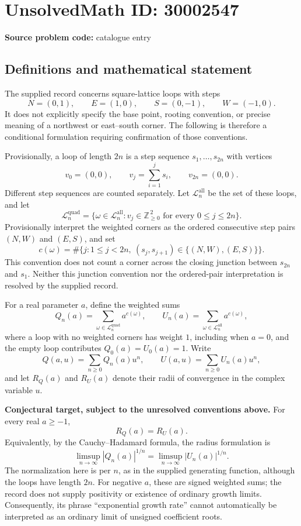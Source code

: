 \documentclass[11pt]{article}
\newcommand{\Z}{\mathbb{Z}}
\begin{document}
\section*{UnsolvedMath ID: 30002547}
\textbf{Source problem code:} catalogue entry
\subsection{Definitions and mathematical statement}
The supplied record concerns square-lattice loops with steps
\[
N=(0,1),\qquad E=(1,0),\qquad S=(0,-1),\qquad W=(-1,0).
\]
It does not explicitly specify the base point, rooting convention, or precise meaning of a northwest or east--south corner. The following is therefore a conditional formulation requiring confirmation of those conventions.

Provisionally, a loop of length \(2n\) is a step sequence \(s_1,\ldots,s_{2n}\) with vertices
\[
v_0=(0,0),\qquad v_j=\sum_{i=1}^{j}s_i,\qquad v_{2n}=(0,0).
\]
Different step sequences are counted separately. Let \(\mathcal L_n^{\mathrm{all}}\) be the set of these loops, and let
\[
\mathcal L_n^{\mathrm{quad}}
=\{\omega\in\mathcal L_n^{\mathrm{all}}:v_j\in\Z_{\geq0}^{\,2}\text{ for every }0\leq j\leq2n\}.
\]
Provisionally interpret the weighted corners as the ordered consecutive step pairs \((N,W)\) and \((E,S)\), and set
\[
c(\omega)=\#\{j:1\leq j<2n,\ (s_j,s_{j+1})\in\{(N,W),(E,S)\}\}.
\]
This convention does not count a corner across the closing junction between \(s_{2n}\) and \(s_1\). Neither this junction convention nor the ordered-pair interpretation is resolved by the supplied record.

For a real parameter \(a\), define the weighted sums
\[
Q_n(a)=\sum_{\omega\in\mathcal L_n^{\mathrm{quad}}}a^{c(\omega)},\qquad
U_n(a)=\sum_{\omega\in\mathcal L_n^{\mathrm{all}}}a^{c(\omega)},
\]
where a loop with no weighted corners has weight \(1\), including when \(a=0\), and the empty loop contributes \(Q_0(a)=U_0(a)=1\). Write
\[
Q(a,u)=\sum_{n\geq0}Q_n(a)u^n,\qquad
U(a,u)=\sum_{n\geq0}U_n(a)u^n,
\]
and let \(R_Q(a)\) and \(R_U(a)\) denote their radii of convergence in the complex variable \(u\).

\textbf{Conjectural target, subject to the unresolved conventions above.} For every real \(a\geq-1\),
\[
R_Q(a)=R_U(a).
\]
Equivalently, by the Cauchy--Hadamard formula, the radius formulation is
\[
\limsup_{n\to\infty}|Q_n(a)|^{1/n}
=
\limsup_{n\to\infty}|U_n(a)|^{1/n}.
\]
The normalization here is per \(n\), as in the supplied generating function, although the loops have length \(2n\). For negative \(a\), these are signed weighted sums; the record does not supply positivity or existence of ordinary growth limits. Consequently, its phrase ``exponential growth rate'' cannot automatically be interpreted as an ordinary limit of unsigned coefficient roots.
\end{document}
